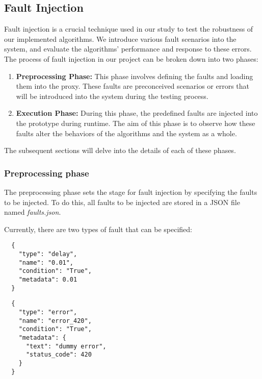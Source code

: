 \subsection{Fault Injection}
\label{subsec:fault_injection}


Fault injection is a crucial technique used in our study to test the robustness of our implemented algorithms. We introduce various fault scenarios into the system, and evaluate the algorithms' performance and response to these errors. 
The process of fault injection in our project can be broken down into two phases:

\begin{enumerate}
  \item \textbf{Preprocessing Phase:} This phase involves defining the faults and loading them into the proxy. These faults are preconceived scenarios or errors that will be introduced into the system during the testing process. 
  \item \textbf{Execution Phase:} During this phase, the predefined faults are injected into the prototype during runtime. The aim of this phase is to observe how these faults alter the behaviors of the algorithms and the system as a whole.
\end{enumerate}

The subsequent sections will delve into the details of each of these phases.

\subsubsection{Preprocessing phase}
\label{subsubssec:preprocessing_phase}
The preprocessing phase sets the stage for fault injection by specifying the faults to be injected. 
To do this, all faults to be injected are stored in a JSON file named \textit{faults.json}.

Currently, there are two types of fault that can be specified:

\begin{multicols}{2}
  \begin{listing}[H]
    
  \begin{verbatim}
  {
    "type": "delay",
    "name": "0.01",
    "condition": "True",
    "metadata": 0.01
  }
  \end{verbatim}
  \caption{Delay type fault}
  \label{code:json_delay}
\end{listing}

  \columnbreak

  \begin{listing}[H]
  \begin{verbatim}
  {
    "type": "error",
    "name": "error_420",
    "condition": "True",
    "metadata": {
      "text": "dummy error",
      "status_code": 420
    }
  }
  \end{verbatim}
  \caption{Error type fault}
  \label{code:json_error}
\end{listing}
\end{multicols}

